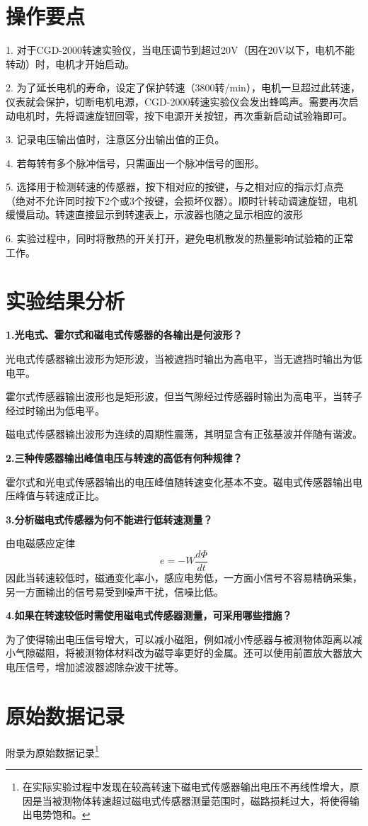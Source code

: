 \documentclass[UTF8]{article}
\begin{document}
	\section{操作要点}
	1.	对于CGD-2000转速实验仪，当电压调节到超过20V（因在20V以下，电机不能转动）时，电机才开始启动。
	
	2.	为了延长电机的寿命，设定了保护转速（3800转/min），电机一旦超过此转速，仪表就会保护，切断电机电源，CGD-2000转速实验仪会发出蜂鸣声。需要再次启动电机时，先将调速旋钮回零，按下电源开关按钮，再次重新启动试验箱即可。
	
	3.	记录电压输出值时，注意区分出输出值的正负。
	
	4.	若每转有多个脉冲信号，只需画出一个脉冲信号的图形。
	
	5.	选择用于检测转速的传感器，按下相对应的按键，与之相对应的指示灯点亮（绝对不允许同时按下2个或3个按键，会损坏仪器）。顺时针转动调速旋钮，电机缓慢启动。转速直接显示到转速表上，示波器也随之显示相应的波形
	
	6.	实验过程中，同时将散热的开关打开，避免电机散发的热量影响试验箱的正常工作。
	
	
	\section{实验结果分析}
	\noindent\textbf{1.光电式、霍尔式和磁电式传感器的各输出是何波形？}
	
	光电式传感器输出波形为矩形波，当被遮挡时输出为高电平，当无遮挡时输出为低电平。
	
	霍尔式传感器输出波形也是矩形波，但当气隙经过传感器时输出为高电平，当转子经过时输出为低电平。
	
	磁电式传感器输出波形为连续的周期性震荡，其明显含有正弦基波并伴随有谐波。
	
	\noindent\textbf{2.三种传感器输出峰值电压与转速的高低有何种规律？}
	
	霍尔式和光电式传感器输出的电压峰值随转速变化基本不变。磁电式传感器输出电压峰值与转速成正比。
	
	\noindent\textbf{3.分析磁电式传感器为何不能进行低转速测量？}
	
	由电磁感应定律
	\[
	e=-W\frac{d\Phi}{dt}
	\]
	因此当转速较低时，磁通变化率小，感应电势低，一方面小信号不容易精确采集，另一方面输出的信号易受到噪声干扰，信噪比低。
	
	\noindent\textbf{4.如果在转速较低时需使用磁电式传感器测量，可采用哪些措施？}
	
	为了使得输出电压信号增大，可以减小磁阻，例如减小传感器与被测物体距离以减小气隙磁阻，将被测物体材料改为磁导率更好的金属。还可以使用前置放大器放大电压信号，增加滤波器滤除杂波干扰等。
	
	\section{原始数据记录}
	附录为原始数据记录\footnote{在实际实验过程中发现在较高转速下磁电式传感器输出电压不再线性增大，原因是当被测物体转速超过磁电式传感器测量范围时，磁路损耗过大，将使得输出电势饱和。}
	
\end{document}
